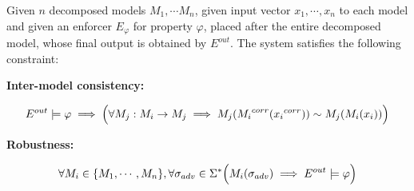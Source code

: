 \begin{definition}
    Given $n$ decomposed models $M_1, \cdots M_n$, given input vector $x_1, \cdots, x_n$ to each model and given an enforcer $E_{\varphi}$ for property $\varphi$, placed after the entire decomposed model, whose final output is obtained by $E^{out}$. %
    The system satisfies the following constraint:
    \begin{flushleft}
            \textbf{Inter-model consistency:}
    \end{flushleft}
    \begin{equation*}
        \label{eq:ro}            
        E^{out} \models \varphi \implies \Bigl( \forall M_j: M_i \rightarrow M_j %
        \implies M_j({M_i}^{corr}({x_i}^{corr})) \sim M_j(M_i(x_i)) \Bigr)
    \end{equation*}
    \begin{flushleft}
            \textbf{Robustness:}
    \end{flushleft}
    \begin{equation*}
        \label{eq:ro}            
         \forall M_i \in \{M_1, \cdots, M_n\}, \forall \sigma_{adv} \in \Sigma^{\ast} 
         \Bigl(M_i(\sigma_{adv})  \implies E^{out} \models \varphi \Bigr)
    \end{equation*}
    \label{constraints3}
\end{definition}


